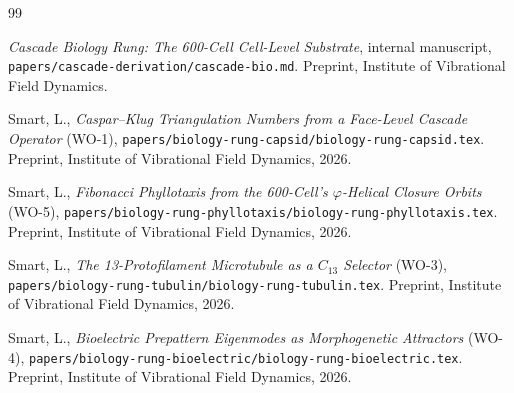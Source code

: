 \documentclass[12pt]{article}
\newcommand{\phig}{\varphi}
\begin{document}
\begin{thebibliography}{99}

\emph{Cascade Biology Rung: The 600-Cell Cell-Level Substrate},
internal manuscript,
\texttt{papers/cascade-derivation/cascade-bio.md}. Preprint,
Institute of Vibrational Field Dynamics.

Smart, L.,
\emph{Caspar--Klug Triangulation Numbers from a Face-Level
Cascade Operator} (WO-1),
\texttt{papers/biology-rung-capsid/biology-rung-capsid.tex}.
Preprint, Institute of Vibrational Field Dynamics, 2026.

Smart, L.,
\emph{Fibonacci Phyllotaxis from the 600-Cell's $\phig$-Helical
Closure Orbits} (WO-5),
\texttt{papers/biology-rung-phyllotaxis/biology-rung-phyllotaxis.tex}.
Preprint, Institute of Vibrational Field Dynamics, 2026.

Smart, L.,
\emph{The 13-Protofilament Microtubule as a $C_{13}$ Selector}
(WO-3),
\texttt{papers/biology-rung-tubulin/biology-rung-tubulin.tex}.
Preprint, Institute of Vibrational Field Dynamics, 2026.

Smart, L.,
\emph{Bioelectric Prepattern Eigenmodes as Morphogenetic
Attractors} (WO-4),
\texttt{papers/biology-rung-bioelectric/biology-rung-bioelectric.tex}.
Preprint, Institute of Vibrational Field Dynamics, 2026.

\end{thebibliography}
\end{document}

